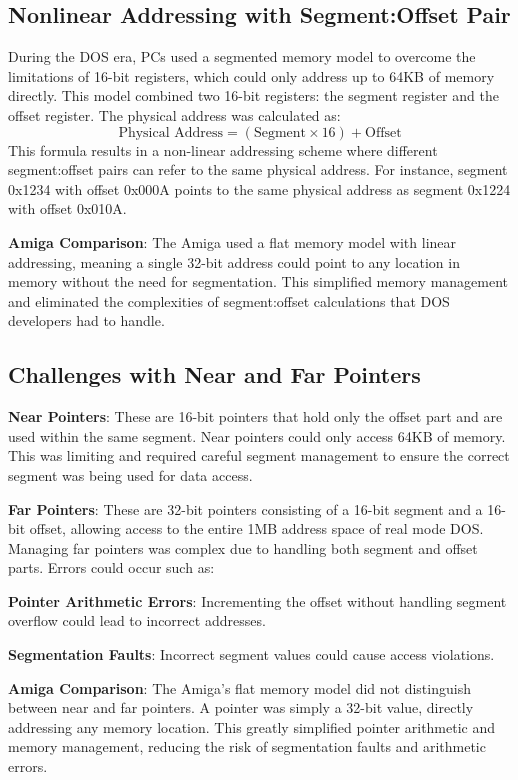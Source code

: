 \documentclass[a4paper]{article}
\begin{document}
\subsection*{Nonlinear Addressing with Segment:Offset Pair}
During the DOS era, PCs used a segmented memory model to overcome the limitations of 16-bit registers, which could only address up to 64KB of memory directly. This model combined two 16-bit registers: the segment register and the offset register. The physical address was calculated as:
\[
\text{Physical Address} = (\text{Segment} \times 16) + \text{Offset}
\]
This formula results in a non-linear addressing scheme where different segment:offset pairs can refer to the same physical address. For instance, segment 0x1234 with offset 0x000A points to the same physical address as segment 0x1224 with offset 0x010A.

\textbf{Amiga Comparison}: The Amiga used a flat memory model with linear addressing, meaning a single 32-bit address could point to any location in memory without the need for segmentation. This simplified memory management and eliminated the complexities of segment:offset calculations that DOS developers had to handle.
\subsection*{Challenges with Near and Far Pointers}
\begin{itemize}
  \begin{item}
    \textbf{Near Pointers}: These are 16-bit pointers that hold only the offset part and are used within the same segment. Near pointers could only access 64KB of memory. This was limiting and required careful segment management to ensure the correct segment was being used for data access.
  \end{item}
  \begin{item}
    \textbf{Far Pointers}: These are 32-bit pointers consisting of a 16-bit segment and a 16-bit offset, allowing access to the entire 1MB address space of real mode DOS. Managing far pointers was complex due to handling both segment and offset parts. Errors could occur such as:
    \begin{itemize}
      \begin{item}
        \textbf{Pointer Arithmetic Errors}: Incrementing the offset without handling segment overflow could lead to incorrect addresses.
      \end{item}
      \begin{item}
        \textbf{Segmentation Faults}: Incorrect segment values could cause access violations.
      \end{item}
    \end{itemize}
  \end{item}
\end{itemize}
\textbf{Amiga Comparison}: The Amiga’s flat memory model did not distinguish between near and far pointers. A pointer was simply a 32-bit value, directly addressing any memory location. This greatly simplified pointer arithmetic and memory management, reducing the risk of segmentation faults and arithmetic errors.
\end{document}
